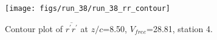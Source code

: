 \begin{figure}[H]
\centering
\texttt{[image: figs/run\_38/run\_38\_rr\_contour]}
\caption{Contour plot of $\overline{r^\prime r^\prime}$ at $z/c$=8.50, $V_{free}$=28.81, station 4.}
\label{fig:run_38_rr_contour}
\end{figure}


